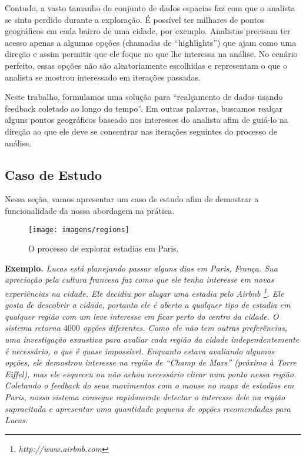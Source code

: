 Contudo, a vasto tamanho do conjunto de dados espacias faz com que o analista se sinta perdido durante a exploração. É possível ter milhares de pontos geográficos em cada bairro de uma cidade, por exemplo. Analistas precisam ter acesso apenas a algumas opções (chamadas de ``highlights'') que ajam como uma direção e assim permitir que ele foque no que lhe interessa na análise. No cenário perfeito, essas opções não são aleatoriamente escolhidas e representam o que o analista se mostrou interessado em iterações passadas.

Neste trabalho, formulamos uma solução para ``realçamento de dados usando feedback coletado ao longo do tempo''. Em outras palavras, buscamos realçar alguns pontos geográficos baseado nos interesses do analista afim de guiá-lo na direção ao que ele deve se concentrar nas iterações seguintes do processo de análise.

\subsection{Caso de Estudo}

Nessa seção, vamos apresentar um caso de estudo afim de demostrar a funcionalidade da nossa abordagem na prática.

\begin{figure}[t]
	\centering
	\texttt{[image: imagens/regions]}
	\caption{O processo de explorar estadias em Paris.}
	\label{fig:regions}
\end{figure}

{\bf Exemplo.} {\em Lucas está planejando passar alguns dias em Paris, França. Sua apreciação pela cultura francesa faz como que ele tenha interesse em novas experiências na cidade. Ele decidiu por alugar uma estadia pelo Airbnb \footnote{\it http://www.airbnb.com}. Ele gosta de descobrir a cidade, portanto ele é aberto a qualquer tipo de estadia em qualquer região com um leve interesse em ficar perto do centro da cidade. O sistema retorna $4000$ opções diferentes. Como ele não tem outras preferências, uma investigação exaustiva para avaliar cada região da cidade independentemente é necessário, o que é quase impossível. Enquanto estava avaliando algumas opções, ele demostrou interesse na região de  ``Champ de Mars'' (próximo à Torre Eiffel), mas ele esqueceu ou não achou necessário clicar num ponto nessa região. Coletando o feedback do seus movimentos com o mouse no mapa de estadias em Paris, nosso sistema consegue rapidamente detectar o interesse dele na região supracitada e apresentar uma quantidade pequena de opções recomendadas para Lucas.}

